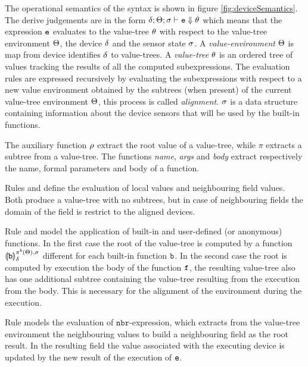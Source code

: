 The operational semantics of the syntax is shown in figure \ref{fig:deviceSemantics}. The derive judgements are in the form $\delta;\Theta;\sigma\vdash \mathtt{e}\Downarrow \theta$ which means that the expression $\mathtt{e}$ evaluates to the value-tree $\theta$ with respect to the value-tree environment $\Theta$, the device $\delta$ and the sensor state $\sigma$. A \textit{value-environment} $\Theta$ is map from device identifies $\delta$ to value-trees. A \textit{value-tree} $\theta$ is an ordered tree of values tracking the results of all the computed subexpressions. The evaluation rules are expressed recursively by evaluating the subexpressions with respect to a new value environment obtained by the subtrees (when present) of the current value-tree environment $\Theta$, this process is called \textit{alignment}. $\sigma$ is a data structure containing information about the device sensors that will be used by the built-in functions.

The auxiliary function $\mathbf{\rho}$ extract the root value of a value-tree, while $\pi$ extracts a subtree from a value-tree. The functions \textit{name}, \textit{args} and \textit{body} extract respectively the name, formal parameters and body of a function.

Rules  and  define the evaluation of local values and neighbouring field values. Both produce a value-tree with no subtrees, but in case of neighbouring fields the domain of the field is restrict to the aligned devices.

Rule  and  model the application of built-in and user-defined (or anonymous) functions. In the first case the root of the value-tree is computed by a function $\llparenthesis \mathtt{b} \rrparenthesis_{ \delta{}}^{\pi^{\mathtt{b}}(\Theta),\sigma}$ different for each built-in function $\mathtt{b}$. In the second case the root is computed by execution the body of the function $\mathtt{f}$, the resulting value-tree also has one additional subtree containing the value-tree resulting from the execution from the body. This is necessary for the alignment of the environment during the execution.

Rule  models the evaluation of $\mathtt{nbr}$-expression, which extracts from the value-tree environment the neighbouring values to build a neighbouring field as the root result. In the resulting field the value associated with the executing device is updated by the new result of the execution of $\mathtt{e}$.

